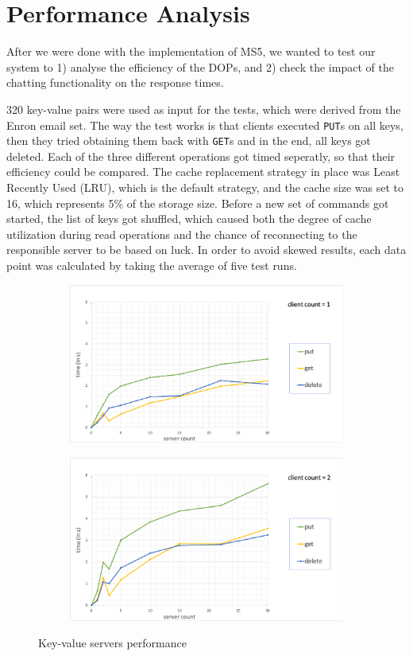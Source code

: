 \section{Performance Analysis}
\label{sec:perf}

After we were done with the implementation of MS5, we wanted to test our system to 1) analyse the efficiency of the DOPs, and 2) check the impact of the chatting functionality on the response times.

320 key-value pairs were used as input for the tests, which were derived from the Enron email set. The way the test works is that clients executed \texttt{PUT}s on all keys, then they tried obtaining them back with \texttt{GET}s and in the end, all keys got deleted. Each of the three different operations got timed seperatly, so that their efficiency could be compared. The cache replacement strategy in place was Least Recently Used (LRU), which is the default strategy, and the cache size was set to 16, which represents 5\% of the storage size. Before a new set of commands got started, the list of keys got shuffled, which caused both the degree of cache utilization during read operations and the chance of reconnecting to the responsible server to be based on luck.
In order to avoid skewed results, each data point was calculated by taking the average of five test runs.

\begin{figure}
	\begin{subfigure}[b]{\linewidth}
	\centering
	\includegraphics[width=0.8\linewidth]{figures/performance/cc1.png}
\caption{}
\label{fig:perf_cc1}
	\end{subfigure}
	\begin{subfigure}[b]{\linewidth}
	\centering
	\includegraphics[width=0.8\linewidth]{figures/performance/cc2.png}
\caption{}
\label{fig:perf_cc2}
	\end{subfigure}
\caption{Key-value servers performance}
\label{fig:perf_cc}
\end{figure}

